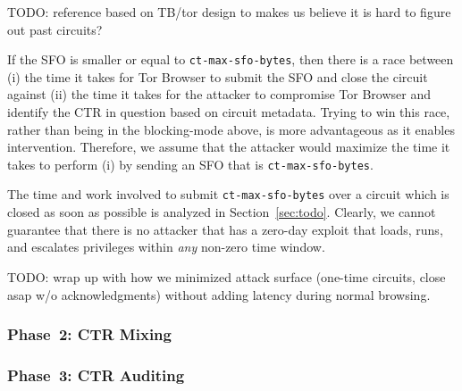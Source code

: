 TODO: reference based on TB/tor design to makes us believe it is hard to figure
out past circuits?

If the SFO is smaller or equal to \texttt{ct-max-sfo-bytes}, then there is a
race between (i) the time it takes for Tor Browser to submit the SFO and close
the circuit against (ii) the time it takes for the attacker to compromise Tor
Browser and identify the CTR in question based on circuit metadata.  Trying to
win this race, rather than being in the blocking-mode above, is more
advantageous as it enables intervention.  Therefore, we assume that
the attacker would maximize the time it takes to perform (i) by sending an
SFO that is \texttt{ct-max-sfo-bytes}.

The time and work involved to submit \texttt{ct-max-sfo-bytes} over a circuit
which is closed as soon as possible is analyzed in Section~\ref{sec:todo}.
Clearly, we cannot guarantee that there is no attacker that has a zero-day
exploit that loads, runs, and escalates privileges within \emph{any} non-zero
time window.

TODO: wrap up with how we minimized attack surface (one-time circuits, close
asap w/o acknowledgments) without adding latency during normal browsing.

\subsubsection{Phase~2: CTR Mixing}

\subsubsection{Phase~3: CTR Auditing}
